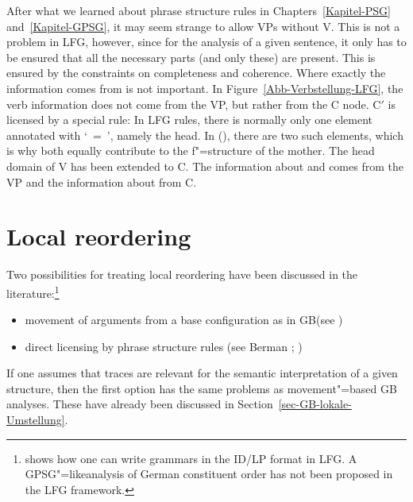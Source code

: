 {%
\noindent
After what we learned about phrase structure rules in Chapters~\ref{Kapitel-PSG} and~\ref{Kapitel-GPSG}, it may seem strange to allow VPs without V. This is not a problem in LFG,
however, since for the analysis of a given sentence, it only has to be ensured that all the necessary parts (and only these) are present. This is ensured by the constraints on 
completeness and coherence. Where exactly the information comes from is not important. In Figure~\ref{Abb-Verbstellung-LFG}, the verb information
does not come from the VP, but rather from the C node.
C$'$ is licensed by a special rule:
\ea
{}
\z
In LFG rules, there is normally only one element annotated with `\up~=~\down', namely the head. In (), there are two such elements, which is why both equally contribute to the
f"=structure of the mother. The head domain of V has been extended to C. The information about \lfgsubj and \lfgobj comes from the VP and the information about \lfgpred{} from C.%

\section{Local reordering}
\label{Abschnitt-LFG-Umstellung}

Two possibilities for treating local reordering have been discussed in the literature:\footnote{%
  \citet[--21]{Kaplan89b} shows how one can write grammars in the ID/LP format in LFG. A GPSG"=like\indexgpsg analysis of German constituent
  order has not been proposed in the LFG framework.%
}
\begin{itemize}
\item movement of arguments from a base configuration as in GB\indexgb (see \citealp{Choi99a-u})
\item direct licensing by phrase structure rules (see Berman \citeyear[Section~2.1.3.1]{Berman96a-u}; \citeyear{Berman2003a})
\end{itemize}

\noindent
If one assumes that traces are relevant for the semantic interpretation of a given structure, then the first option has the same problems as movement"=based GB analyses.
These have already been discussed in Section~\ref{sec-GB-lokale-Umstellung}.

}
